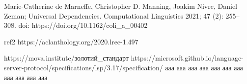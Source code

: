 \thispagestyle{empty}
\begin{thebibliography}{99}

{}

Marie-Catherine de Marneffe, Christopher D. Manning, Joakim Nivre, Daniel Zeman;
Universal Dependencies. Computational Linguistics 2021; 47 (2): 255–308. doi:
https://doi.org/10.1162/coli\_a\_00402

 ref2
https://aclanthology.org/2020.lrec-1.497

https://mova.institute/золотий\_стандарт
https://microsoft.github.io/language-server-protocol/specifications/lsp/3.17/specification/
ааа
ааа
ааа
ааа
ааа
ааа
ааа
ааа
ааа
ааа
ааа

\end{thebibliography}